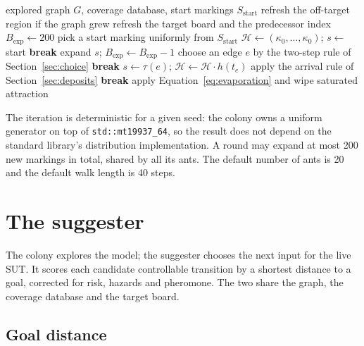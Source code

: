 \documentclass[11pt,a4paper]{article}
\newcommand{\TS}{\mathcal{H}}
\begin{document}
\begin{algorithm}[htbp]
\caption{One colony iteration (defaults in brackets)}
\label{alg:iteration}
\begin{algorithmic}[1]
\Require explored graph $G$, coverage database, start markings $S_{\mathrm{start}}$
\State refresh the off-target region if the graph grew 
\State refresh the target board and the predecessor index
\State $B_{\mathrm{exp}}\gets 200$ 
  \State pick a start marking uniformly from $S_{\mathrm{start}}$
  \State $\TS\gets(\kappa_0,\dots,\kappa_0)$; $s\gets$ start
       \textbf{break} \EndIf
      \State expand $s$; $B_{\mathrm{exp}}\gets B_{\mathrm{exp}}-1$
    \EndIf
    \State choose an edge $e$ by the two-step rule of Section~\ref{sec:choice}
     \textbf{break} \EndIf
    \State $s\gets\tau(e)$; $\TS\gets\TS\cdot h(t_e)$
    \State apply the arrival rule of Section~\ref{sec:deposits}
     \textbf{break} \EndIf
  \EndFor
\EndFor
{}
  \State apply Equation~\eqref{eq:evaporation} and wipe saturated attraction
\EndIf
\end{algorithmic}
\end{algorithm}

The iteration is deterministic for a given seed: the colony owns a uniform
generator on top of \texttt{std::mt19937\_64}, so the result does not depend
on the standard library's distribution implementation.  A round may expand at
most 200 new markings in total, shared by all its ants.  The default number of
ants is 20 and the default walk length is 40 steps.

\section{The suggester}\label{sec:suggester}

The colony explores the model; the suggester chooses the next input for the
live SUT.  It scores each candidate controllable transition by a shortest
distance to a goal, corrected for risk, hazards and pheromone.  The two share
the graph, the coverage database and the target board.

\subsection{Goal distance}
\end{document}
